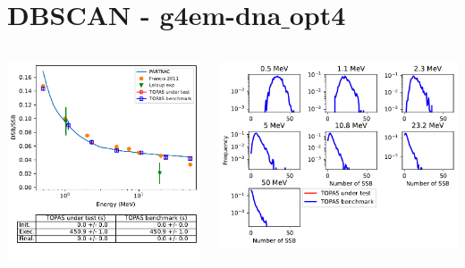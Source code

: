 \documentclass[aspectratio=1610]{beamer}
\begin{document}
\section{DBSCAN - g4em-dna$\_$opt4}

\begin{frame}{\secname}
 \begin{columns}
  \begin{column}{0.4\linewidth}
   \includegraphics[width=1.1\textwidth]{./DBSCAN/DBSCAN2_g4em-dna_opt4}
  \end{column}
  \begin{column}{0.6\linewidth} 
   \includegraphics[width=\textwidth]{./DBSCAN/DBSCAN1_g4em-dna_opt4}

\end{column}
\end{columns}
\end{frame}
\end{document}
